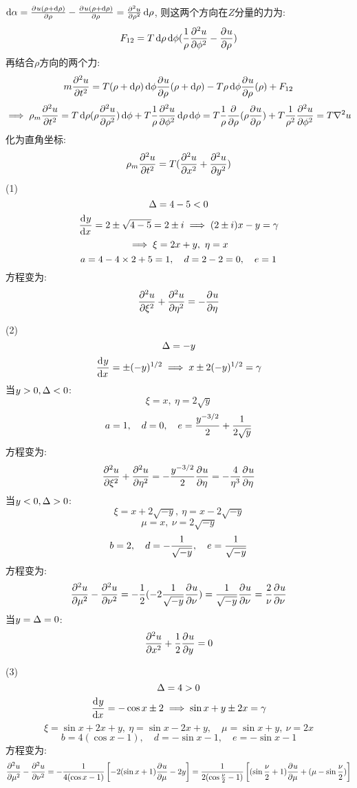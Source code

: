 \documentclass[UTF8,9pt]{ctexart}
\begin{document}
$\d\a=\pp{u(\rho+\d\rho)}{\rho}-\pp{u(\rho+\d\rho)}{\rho}=\pp[2]{u}{\rho}\d\rho$, 则这两个方向在$Z$分量的力为:
$$F_{12}=T\d\rho\d\phi(\ff{\rho}\pp[2]{u}{\phi}-\pp{u}{\rho})$$
再结合$\rho$方向的两个力:
$$m\pt[2]{u}=T(\rho+\d\rho)\d\phi\pp{u}{\rho}(\rho+\d\rho)-T\rho\d\phi\pp{u}{\rho}(\rho)+F_{12}$$
$$\ip \rho_m\pt[2]{u}=T\d\rho(\rho\pp[2]{u}{\rho})\d\phi+T\ff{\rho}\pp[2]{u}{\phi}\d\rho\d\phi=T\ff{\rho}\pp{}{\rho}(\rho\pp{u}{\rho})+T\ff{\rho^2}\pp[2]{u}{\phi}=T\nabla^2 u$$
化为直角坐标:
$$\rho_m\pp[2]{u}{t}=T(\pp[2]{u}{x}+\pp[2]{u}{y})$$
\newpage
{}
(1) 
$$\D=4-5<0$$
$$\dd{y}{x}=2\pm\sqrt{4-5}=2 \pm i \ip (2 \pm i)x-y=\gamma$$
$$\ip \xi=2x+y,\ \eta=x$$
$$a=4 -4\tm 2+5=1,\quad d = 2-2=0,\quad e = 1$$
方程变为:
$$\pp[2]{u}{\xi}+\pp[2]{u}{\eta} = -\pp{u}{\eta}$$

(2)
$$\D=-y$$
$$\dd{y}{x}=\pm (-y)^{1/2} \ip x\pm 2(-y)^{1/2}=\gamma$$
当$y>0,\D<0$:
$$\xi=x,\ \eta=2\sqrt{y}$$
$$a=1,\quad d=0,\quad e=\f{y^{-3/2}}{2}+\ff{2\sqrt{y}}$$
方程变为:
$$\pp[2]{u}{\xi}+\pp[2]{u}{\eta} = -\f{y^{-3/2}}{2}\pp{u}{\eta} = -\f{4}{\eta^3}\pp{u}{\eta}$$
当$y<0,\D>0$:
$$\xi=x + 2\sqrt{-y},\ \eta=x - 2\sqrt{-y}$$
$$\mu=x,\ \nu=2\sqrt{-y}$$
$$b=2,\quad d=-\ff{\sqrt{-y}},\quad e=\ff{\sqrt{-y}}$$
方程变为:
$$\pp[2]{u}{\mu}-\pp[2]{u}{\nu} = -\ff{2}(-2\ff{\sqrt{-y}}\pp{u}{\nu})=\ff{\sqrt{-y}}\pp{u}{\nu} = \f{2}{\nu}\pp{u}{\nu}$$
当$y=\D=0$:
$$\pp[2]{u}{x}+\ff{2}\pp{u}{y}=0$$

(3)
$$\D = 4>0$$
$$\dd{y}{x}=-\cos x \pm 2 \ip \sin x +y \pm 2x=\gamma$$
$$\xi=\sin x + 2x + y,\ \eta=\sin x - 2x + y,\quad\mu=\sin x + y,\ \nu = 2x$$
$$b=4(\cos x-1),\quad d=-\sin x-1,\quad e=-\sin x-1$$
方程变为:
$$\pp[2]{u}{\mu}-\pp[2]{u}{\nu} = -\ff{4(\cos x-1)}\left[-2(\sin x+1)\pp{u}{\mu}-2y\right] = \ff{2(\cos \f{\nu}{2}-1)}\left[(\sin \f{\nu}{2}+1)\pp{u}{\mu}+(\mu - \sin\f{\nu}{2})\right]$$
\end{document}
